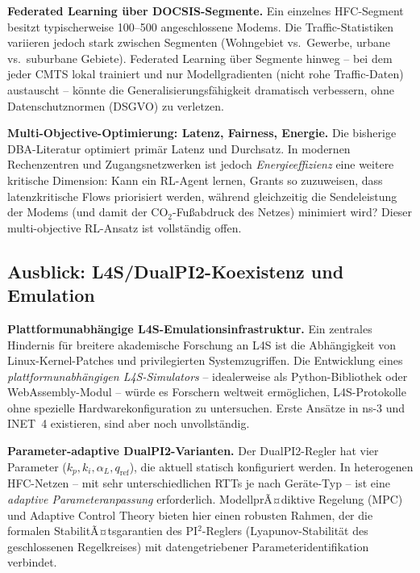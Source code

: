 ﻿\documentclass[a4paper,12pt]{article}
\theoremstyle{definition}
\begin{document}
\textbf{Federated Learning \"{u}ber DOCSIS-Segmente.}
Ein einzelnes HFC-Segment besitzt typischerweise 100--500 angeschlossene Modems.
Die Traffic-Statistiken variieren jedoch stark zwischen Segmenten (Wohngebiet
vs.\ Gewerbe, urbane vs.\ suburbane Gebiete). Federated Learning \"{u}ber
Segmente hinweg -- bei dem jeder CMTS lokal trainiert und nur Modellgradienten
(nicht rohe Traffic-Daten) austauscht -- k\"{o}nnte die Generalisierungsf\"{a}higkeit
dramatisch verbessern, ohne Datenschutznormen (DSGVO) zu verletzen.

\textbf{Multi-Objective-Optimierung: Latenz, Fairness, Energie.}
Die bisherige DBA-Literatur optimiert prim\"{a}r Latenz und Durchsatz. In modernen
Rechenzentren und Zugangsnetzwerken ist jedoch \emph{Energieeffizienz} eine
weitere kritische Dimension: Kann ein RL-Agent lernen, Grants so zuzuweisen,
dass latenzkritische Flows priorisiert werden, w\"{a}hrend gleichzeitig die
Sendeleistung der Modems (und damit der CO$_2$-Fu{\ss}abdruck des Netzes) minimiert wird?
Dieser multi-objective RL-Ansatz ist vollst\"{a}ndig offen.

\subsection{Ausblick: L4S/DualPI2-Koexistenz und Emulation}

\textbf{Plattformunabh\"{a}ngige L4S-Emulationsinfrastruktur.}
Ein zentrales Hindernis f\"{u}r breitere akademische Forschung an L4S ist die
Abh\"{a}ngigkeit von Linux-Kernel-Patches und privilegierten System\-zugriffen.
Die Entwicklung eines \emph{plattformunabh\"{a}ngigen L4S-Simulators} -- idealerweise
als Python-Bibliothek oder WebAssembly-Modul -- w\"{u}rde es Forschern weltweit
erm\"{o}glichen, L4S-Protokolle ohne spezielle Hardwarekonfiguration zu untersuchen.
Erste Ans\"{a}tze in ns-3 und INET~4 existieren, sind aber noch unvollst\"{a}ndig.

\textbf{Parameter-adaptive DualPI2-Varianten.}
Der DualPI2-Regler hat vier Parameter ($k_p, k_i, \alpha_L, q_{\mathrm{ref}}$),
die aktuell statisch konfiguriert werden. In heterogenen HFC-Netzen -- mit
sehr unterschiedlichen RTTs je nach Ger\"{a}te-Typ -- ist eine
\emph{adaptive Parameteranpassung} erforderlich. ModellprÃ¤diktive Regelung
(MPC) und Adaptive Control Theory bieten hier einen robusten Rahmen, der
die formalen StabilitÃ¤tsgarantien des PI$^2$-Reglers (Lyapunov-Stabilit\"{a}t
des geschlossenen Regelkreises) mit datengetriebener Parameteridentifikation
verbindet.
\end{document}
